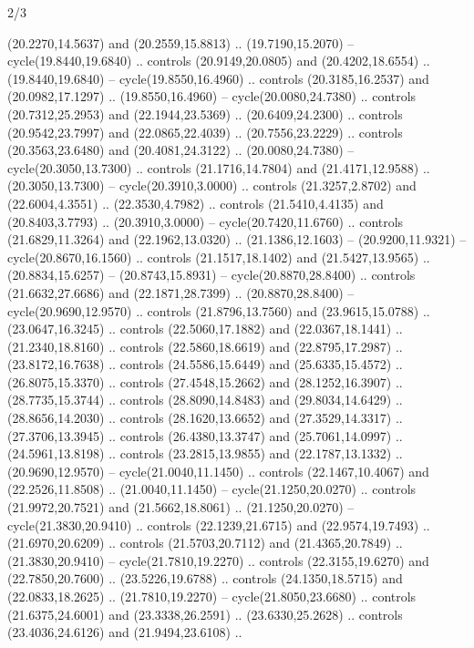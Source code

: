 \begin{flagdescription}{2/3}
\begin{scope}[yshift=\flagwidth,scale=\flagwidth/1241.93737]
\begin{scope}[y=-1mm, x=1mm,draw=gold,fill=blue,line join=miter,miter limit=4,line width=1.8\lw]
\begin{scope}[y=1mm, x=1mm, yscale=-1,shift={(573.68mm+\str,145.75)}]
\begin{scope}[scale=1.35,shift={(-9,-3)}]
\begin{scope}[scale=0.55]
\begin{scope}[scale=1.333]
    (20.2270,14.5637) and (20.2559,15.8813) .. (19.7190,15.2070) --
    cycle(19.8440,19.6840) .. controls (20.9149,20.0805) and (20.4202,18.6554) ..
    (19.8440,19.6840) -- cycle(19.8550,16.4960) .. controls (20.3185,16.2537) and
    (20.0982,17.1297) .. (19.8550,16.4960) -- cycle(20.0080,24.7380) .. controls
    (20.7312,25.2953) and (22.1944,23.5369) .. (20.6409,24.2300) .. controls
    (20.9542,23.7997) and (22.0865,22.4039) .. (20.7556,23.2229) .. controls
    (20.3563,23.6480) and (20.4081,24.3122) .. (20.0080,24.7380) --
    cycle(20.3050,13.7300) .. controls (21.1716,14.7804) and (21.4171,12.9588) ..
    (20.3050,13.7300) -- cycle(20.3910,3.0000) .. controls (21.3257,2.8702) and
    (22.6004,4.3551) .. (22.3530,4.7982) .. controls (21.5410,4.4135) and
    (20.8403,3.7793) .. (20.3910,3.0000) -- cycle(20.7420,11.6760) .. controls
    (21.6829,11.3264) and (22.1962,13.0320) .. (21.1386,12.1603) --
    (20.9200,11.9321) -- cycle(20.8670,16.1560) .. controls (21.1517,18.1402) and
    (21.5427,13.9565) .. (20.8834,15.6257) -- (20.8743,15.8931) --
    cycle(20.8870,28.8400) .. controls (21.6632,27.6686) and (22.1871,28.7399) ..
    (20.8870,28.8400) -- cycle(20.9690,12.9570) .. controls (21.8796,13.7560) and
    (23.9615,15.0788) .. (23.0647,16.3245) .. controls (22.5060,17.1882) and
    (22.0367,18.1441) .. (21.2340,18.8160) .. controls (22.5860,18.6619) and
    (22.8795,17.2987) .. (23.8172,16.7638) .. controls (24.5586,15.6449) and
    (25.6335,15.4572) .. (26.8075,15.3370) .. controls (27.4548,15.2662) and
    (28.1252,16.3907) .. (28.7735,15.3744) .. controls (28.8090,14.8483) and
    (29.8034,14.6429) .. (28.8656,14.2030) .. controls (28.1620,13.6652) and
    (27.3529,14.3317) .. (27.3706,13.3945) .. controls (26.4380,13.3747) and
    (25.7061,14.0997) .. (24.5961,13.8198) .. controls (23.2815,13.9855) and
    (22.1787,13.1332) .. (20.9690,12.9570) -- cycle(21.0040,11.1450) .. controls
    (22.1467,10.4067) and (22.2526,11.8508) .. (21.0040,11.1450) --
    cycle(21.1250,20.0270) .. controls (21.9972,20.7521) and (21.5662,18.8061) ..
    (21.1250,20.0270) -- cycle(21.3830,20.9410) .. controls (22.1239,21.6715) and
    (22.9574,19.7493) .. (21.6970,20.6209) .. controls (21.5703,20.7112) and
    (21.4365,20.7849) .. (21.3830,20.9410) -- cycle(21.7810,19.2270) .. controls
    (22.3155,19.6270) and (22.7850,20.7600) .. (23.5226,19.6788) .. controls
    (24.1350,18.5715) and (22.0833,18.2625) .. (21.7810,19.2270) --
    cycle(21.8050,23.6680) .. controls (21.6375,24.6001) and (23.3338,26.2591) ..
    (23.6330,25.2628) .. controls (23.4036,24.6126) and (21.9494,23.6108) ..

\end{scope}
\end{scope}
\end{scope}
\end{scope}
\end{scope}
\end{scope}
\end{flagdescription}
